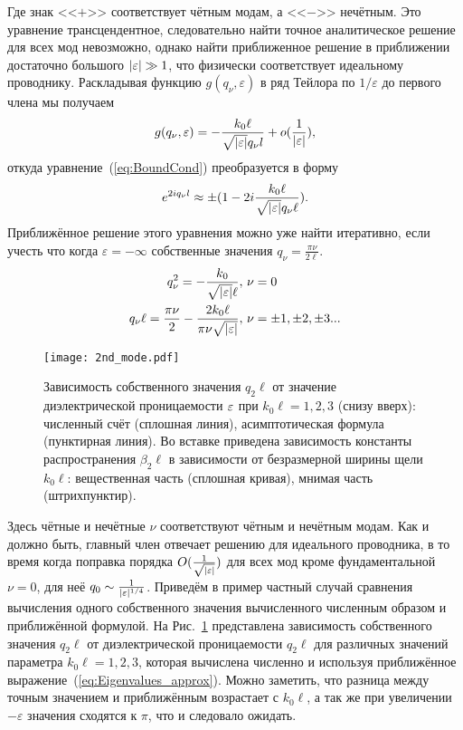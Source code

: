 Где знак <<$+$>> соответствует чётным модам, а <<$-$>> нечётным. Это уравнение трансцендентное, следовательно найти точное аналитическое решение
для всех мод невозможно, однако найти приближенное решение в приближении достаточно большого $\lvert\varepsilon\rvert \gg 1$, что физически 
соответствует идеальному проводнику.
Раскладывая функцию $g(q_\nu,\varepsilon)$ в ряд Тейлора по $1/\varepsilon$ до первого члена мы получаем
\begin{equation*}
g(q_\nu,\varepsilon) = -\frac{k_0 \ell}{\sqrt{\lvert\varepsilon\rvert}q_\nu l} + o(\frac{1}{\lvert\varepsilon\rvert}),
\end{equation*}
откуда уравнение~(\ref{eq:BoundCond}) преобразуется в форму
\begin{equation}
e^{2i q_\nu l} \approx \pm(1 - 2i\frac{k_0 \ell}{\sqrt{\lvert\varepsilon\rvert} q_\nu \ell}).\label{eq:BoundCond_simple}
\end{equation}
Приближённое решение этого уравнения можно уже найти итеративно, если учесть что когда $\varepsilon = -\infty$ собственные значения
$q_\nu = \frac{\pi \nu}{2 \ell}$.
\begin{align}
q_\nu^2  = -\frac{k_0}{ \sqrt{\lvert\varepsilon\rvert} \ell}, &\ \nu = 0 \nonumber \\
q_\nu \ell = \frac{\pi \nu}{2} - \frac{2k_0\ell}{\pi \nu \sqrt{\lvert\varepsilon\rvert}}, &\ \nu = \pm 1,\pm 2,\pm 3...\label{eq:Eigenvalues_approx}
\end{align}
\begin{figure}
\texttt{[image: 2nd\_mode.pdf]}
  \caption{Зависимость собственного значения $q_2\ell$ от значение диэлектрической проницаемости $\varepsilon$ при $k_0 \ell = 1,2,3$ (снизу вверх):
  численный счёт (сплошная линия), асимптотическая формула (пунктирная линия). Во вставке приведена зависимость константы распространения 
  $\beta_2 \ell$ в зависимости от безразмерной ширины щели $k_0\ell$: вещественная часть (сплошная кривая), мнимая часть (штрихпунктир).}
  \label{fig:2nd_mode}
\end{figure}
Здесь чётные и нечётные $\nu$ соответствуют чётным и нечётным модам. Как и должно быть, главный член отвечает решению для идеального
проводника, в то время когда поправка порядка $O(\frac{1}{\sqrt{\lvert\varepsilon\rvert}})$ для всех мод кроме фундаментальной $\nu = 0$, для 
неё $q_0 \sim \frac{1}{\lvert\varepsilon\rvert^{1/4}}$. Приведём в пример частный случай сравнения вычисления одного собственного значения
вычисленного численным образом и приближённой формулой. На Рис.~\ref{fig:2nd_mode} представлена зависимость собственного значения $q_2\ell$ от 
диэлектрической проницаемости  $q_2\ell$ для различных значений параметра $k_0 \ell = 1,2,3$, которая вычислена численно и используя 
приближённое выражение~(\ref{eq:Eigenvalues_approx}). Можно заметить, что разница между точным значением и приближённым возрастает с 
 $k_0 \ell$, а так же при увеличении $-\varepsilon$ значения сходятся к $\pi$, что и следовало ожидать. 

